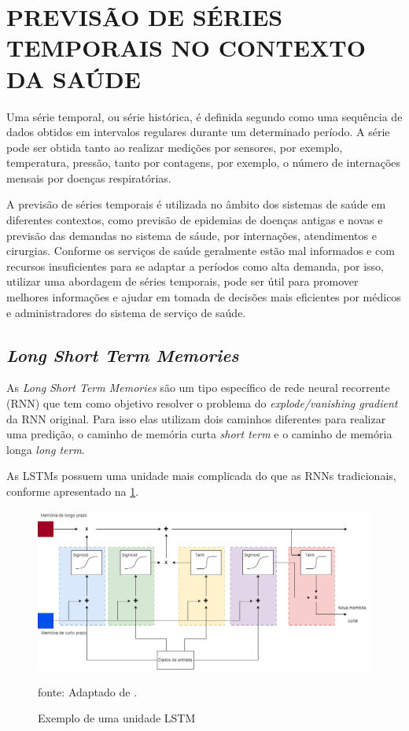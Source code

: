 \documentclass[
  12pt,		%
  a4paper,	%
  openright,%
  oneside,	%
  chapter=TITLE,		%
  section=TITLE,		%
  english,	%
  french,	%
  spanish,	%
  brazil	%
]{abntex2}
\begin{document}
    \section{PREVISÃO DE SÉRIES TEMPORAIS NO CONTEXTO DA SAÚDE}
    Uma série temporal, ou série histórica, é definida segundo \cite[]{series_temporais}
    como uma sequência de dados obtidos em intervalos regulares durante um determinado período.
    A série pode ser obtida tanto ao realizar medições por sensores, por exemplo, temperatura, pressão, 
    tanto por contagens, por exemplo, o número de internações mensais por doenças respiratórias.

    A previsão de séries temporais é utilizada no âmbito dos sistemas de saúde em diferentes contextos, como 
    previsão de epidemias de doenças antigas e novas e previsão das demandas no sistema de sáude, por internações, atendimentos e cirurgias.
    Conforme \cite[]{forcasting_health} os serviços de saúde geralmente estão mal informados 
    e com recursos insuficientes para se adaptar a períodos como alta demanda, por isso, utilizar uma abordagem
    de séries temporais, pode ser útil para promover melhores informações e ajudar em tomada de 
    decisões mais eficientes por médicos e administradores do sistema de serviço de saúde.

    \subsection{\textit{Long Short Term Memories}}
    \label{LSTM}
    As \textit{Long Short Term Memories} são um tipo específico de rede neural recorrente (RNN) que tem como objetivo
    resolver o problema do \textit{explode/vanishing gradient} da RNN original. Para isso elas utilizam dois caminhos
    diferentes para realizar uma predição, o caminho de memória curta \textit{short term} e o caminho de memória longa
    \textit{long term}.

    As LSTMs possuem uma unidade mais complicada do que as RNNs tradicionais, conforme apresentado na \ref*{lstm_unit}.
    \begin{figure}[ht]
        \centering
        \caption{Exemplo de uma unidade LSTM}
        \includegraphics[width=12cm]{../reports/figures/LSTM_unit.png}
        \label{lstm_unit}
        \par
        {\small fonte: Adaptado de \cite[]{statquest}.}
    \end{figure}
\end{document}
